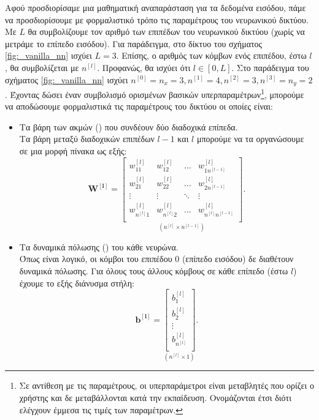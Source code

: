 Αφού προσδιορίσαμε μια μαθηματική αναπαράσταση για τα δεδομένα εισόδου, πάμε να προσδιορίσουμε με φορμαλιστικό τρόπο τις παραμέτρους του νευρωνικού δικτύου. Με $L$ θα συμβολίζουμε τον αριθμό των επιπέδων του νευρωνικού δικτύου (χωρίς να μετράμε το επίπεδο εισόδου). Για παράδειγμα, στο δίκτυο του σχήματος \ref{fig:_vanilla_nn} ισχύει $L=3$. Επίσης, ο αριθμός των κόμβων ενός επιπέδου, έστω $l$, θα συμβολίζεται με $n^{[l]}$. Προφανώς, θα ισχύει ότι $l \in [0,L]$. Στο παράδειγμα του σχήματος \ref{fig:_vanilla_nn} ισχύει $n^{[0]}=n_x=3, n^{[1]}=4, n^{[2]}=3, n^{[3]}=n_y=2$. Έχοντας δώσει έναν συμβολισμό ορισμένων βασικών υπερπαραμέτρων\footnote{Σε αντίθεση με τις παραμέτρους, οι υπερπαράμετροι είναι μεταβλητές που ορίζει ο χρήστης και δε μεταβάλλονται κατά την εκπαίδευση. Ονομάζονται έτσι διότι ελέγχουν έμμεσα τις τιμές των παραμέτρων.}, μπορούμε να αποδώσουμε φορμαλιστικά τις παραμέτρους του δικτύου οι οποίες είναι:
\begin{itemize}
    \item Τα βάρη των ακμών () που συνδέουν δύο διαδοχικά επίπεδα.\\
    Τα βάρη μεταξύ διαδοχικών επιπέδων $l-1$ και $l$ μπορούμε να τα οργανώσουμε σε μια μορφή πίνακα ως εξής:
    \begin{equation}
        \boldsymbol{W^{[l]}} =
        \underset{(n^{[l]} \times n^{[l-1]})}{\begin{bmatrix}
            w^{[l]}_{11}&w^{[l]}_{12}& \dots&w^{[l]}_{1n^{[l-1]}} \\[0.5em]
            w^{[l]}_{21}&w^{[l]}_{22}& \dots&w^{[l]}_{2n^{[l-1]}}\\[0.3em]
            \vdots & \vdots& \ddots& \vdots \\[0.3em]
            w^{[l]}_{n^{[l]}1}&w^{[l]}_{n^{[l]}2}& \dots&w^{[l]}_{n^{[l]}n^{[l-1]}}\\[0.5em]
        \end{bmatrix}}.
    \end{equation}
    \item Τα δυναμικά πόλωσης () του κάθε νευρώνα. \\
    Όπως είναι λογικό, οι κόμβοι του επιπέδου $0$ (επίπεδο εισόδου) δε διαθέτουν δυναμικά πόλωσης. Για όλους τους άλλους κόμβους σε κάθε επίπεδο (έστω $l$) έχουμε το εξής διάνυσμα στήλη:
    \begin{equation}
        \boldsymbol{b^{[l]}} = 
        \underset{(n^{[l]} \times 1)}{
            \begin{bmatrix}
                b^{[l]}_1 \\[0.3em]
                b^{[l]}_2 \\[0.3em]
                \vdots \\[0.3em]
                b^{[l]}_{n^{[l]}}\\[0.3em]
            \end{bmatrix}}.
    \end{equation}
\end{itemize}

